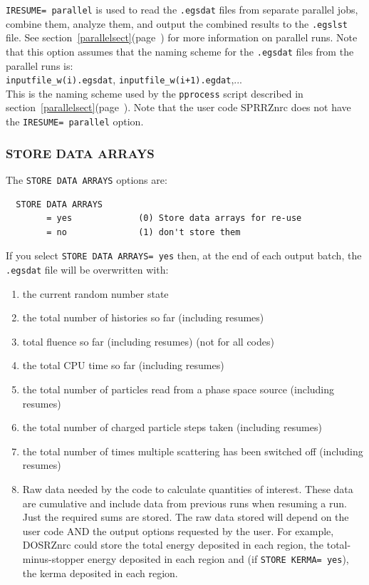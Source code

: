 \documentclass[12pt,twoside]{article}  %
\newcommand{\lpage}[1]{(page~\pageref{#1})}
\begin{document}
{\tt IRESUME= parallel} is used to read the {\tt .egsdat} files from
separate parallel jobs, combine them, analyze them, and output the
combined results to the {\tt .egslst} file.  See
section~\ref{parallelsect}\lpage{parallelsect}
for more information on parallel runs.  Note that this option assumes
that the naming scheme for the {\tt .egsdat} files from the parallel runs
is:\\
{\tt inputfile\_w(i).egsdat}, {\tt inputfile\_w(i+1).egdat},... \\
This is the naming scheme used by the {\tt pprocess} script described
in section~\ref{parallelsect}\lpage{parallelsect}.  Note that the user
code SPRRZnrc does not have the {\tt IRESUME= parallel} option.

\subsubsection{STORE DATA ARRAYS}
\label{dataarrsect}

The {\tt STORE DATA ARRAYS} options are:

\begin{verbatim}
  STORE DATA ARRAYS
        = yes             (0) Store data arrays for re-use
        = no              (1) don't store them
\end{verbatim}

If you select {\tt STORE DATA ARRAYS= yes} then, at the end of each output
batch, the {\tt .egsdat} file will be overwritten with:

\begin{enumerate}
\item the current random number state
\item the total number of histories so far (including resumes)
\item total fluence so far (including resumes) (not for all codes)
\item the total CPU time so far (including resumes)
\item the total number of particles read from a phase space source
        (including resumes)
\item the total number of charged particle steps taken (including resumes)
\item the total number of times multiple scattering has been switched off
      (including resumes)
\item Raw data needed by the code to calculate quantities of interest.
      These data are cumulative and include data from previous runs when
      resuming a run.  Just the required sums are stored.  The raw
      data stored will depend on the user code AND the output options
      requested by the user.  For example, DOSRZnrc could store the
      total energy deposited in each region, the total-minus-stopper
      energy deposited in each region and (if {\tt STORE KERMA= yes}),
      the kerma deposited in each region.
\end{enumerate}
\end{document}
